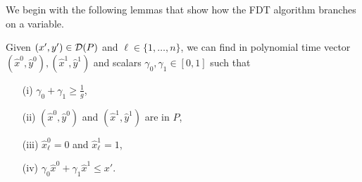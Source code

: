 \documentclass[runningheads]{llncs}
\begin{document}
We begin with the following lemmas that show how the FDT algorithm branches on a variable.
\begin{lemma}\label{LPClemma}
	Given $(x',y')\in \operatorname{\mathcal{D}}(P)$ and $\ell\in \{1,\ldots,n\}$, we can find in polynomial time vector $(\hat{x}^0,\hat{y}^0),(\hat{x}^1,\hat{y}^1)$ and scalars $\gamma_0,\gamma_1 \in [0,1]$ such that
	\begin{itemize}
		\item[(i)] $\gamma_0 + \gamma_1  \geq \frac{ 1}{g}$,
		\item[(ii)] $(\hat{x}^0,\hat{y}^0)$ and $(\hat{x}^1,\hat{y}^1)$ are in  $ P$, 
		\item[(iii)] $\hat{x}^0_\ell=0$ and $\hat{x}^1_\ell=1$,
		\item[(iv)] $\gamma_0 \hat{x}^0 + \gamma_1\hat{x}^1 \leq x'$.
	\end{itemize}
\end{lemma}
\end{document}
